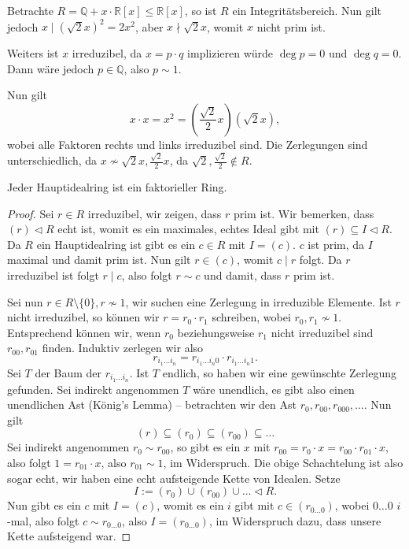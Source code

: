 \begin{example}
    Betrachte $R = \mathbb{Q} + x \cdot \mathbb{R}[x] \leq \mathbb{R}[x]$, so ist $R$ ein Integritätsbereich. Nun gilt jedoch $x \mid (\sqrt{2} x)^2 = 2x^2$, aber $x \nmid \sqrt{2}x$, womit $x$ nicht prim ist.
    
    Weiters ist $x$ irreduzibel, da $x = p \cdot q$ implizieren würde $\deg{p} = 0$ und $\deg{q} = 0$. Dann wäre jedoch $p \in \mathbb{Q}$, also $p \sim 1$.
    
    Nun gilt
    $$ x \cdot x = x^2 = \left(\frac{\sqrt{2}}{2} x\right)(\sqrt{2}x), $$
    wobei alle Faktoren rechts und links irreduzibel sind. Die Zerlegungen sind unterschiedlich, da $x \not\sim \sqrt{2} x, \frac{\sqrt{2}}{2} x$, da $\sqrt{2}, \frac{\sqrt{2}}{2} \notin R$.
\end{example}

\begin{proposition}
    Jeder Hauptidealring ist ein faktorieller Ring.
\end{proposition}

\begin{proof}
    Sei $r \in R$ irreduzibel, wir zeigen, dass $r$ prim ist. Wir bemerken, dass $ (r) \vartriangleleft R $ echt ist, womit es ein maximales, echtes Ideal gibt mit $(r) \subseteq I \vartriangleleft R$. Da $R$ ein Hauptidealring ist gibt es ein $c \in R$ mit $I = (c)$. $c$ ist prim, da $I$ maximal und damit prim ist. Nun gilt $r \in (c)$, womit $c \mid r$ folgt. Da $r$ irreduzibel ist folgt $r \mid c$, also folgt $r \sim c$ und damit, dass $r$ prim ist.

    Sei nun $r \in R \setminus \{0\}, r \not\sim 1$, wir suchen eine Zerlegung in irreduzible Elemente. Ist $r$ nicht irreduzibel, so können wir $r = r_0 \cdot r_1$ schreiben, wobei $r_0, r_1 \not\sim 1$. Entsprechend können wir, wenn $r_0$ beziehungsweise $r_1$ nicht irreduzibel sind $r_{00}, r_{01}$ finden. Induktiv zerlegen wir also
    $$ r_{i_1 \hdots i_n} = r_{i_1 \hdots i_n 0} \cdot r_{i_1 \hdots i_n 1}. $$
    Sei $T$ der Baum der $r_{i_1 \hdots i_n}$. Ist $T$ endlich, so haben wir eine gewünschte Zerlegung gefunden. Sei indirekt angenommen $T$ wäre unendlich, es gibt also einen unendlichen Ast (König's Lemma) -- \obda betrachten wir den Ast $r_0, r_{00}, r_{000}, \hdots$. Nun gilt
    $$ (r) \subseteq (r_0) \subseteq (r_{00}) \subseteq \hdots $$
    Sei indirekt angenommen $r_0 \sim r_{00}$, so gibt es ein $x$ mit $r_{00} = r_0 \cdot x = r_{00} \cdot r_{01} \cdot x$, also folgt $ 1 = r_{01} \cdot x$, also $r_{01} \sim 1$, im Widerspruch. Die obige Schachtelung ist also sogar echt, wir haben eine echt aufsteigende Kette von Idealen. Setze
    $$ I := (r_0) \cup (r_{00}) \cup \hdots \vartriangleleft R. $$
    Nun gibt es ein $c$ mit $I = (c)$, womit es ein $i$ gibt mit $c \in (r_{0 \hdots 0})$, wobei $0 \hdots 0$ $i$-mal, also folgt $c \sim r_{0 \hdots 0}$, also $I = (r_{0 \hdots 0})$, im Widerspruch dazu, dass unsere Kette aufsteigend war.
\end{proof}

